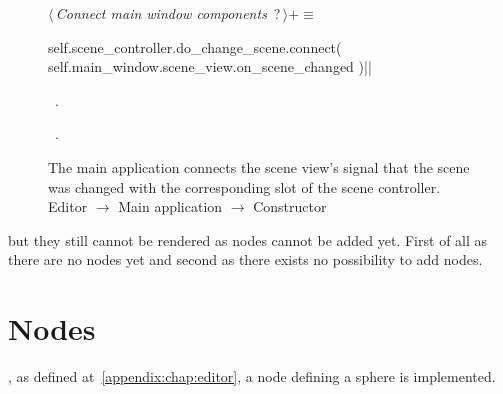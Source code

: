 \documentclass[%
    a4paper,    %
    justified,  %
    nobib,      %
    openany     %
]{tufte-book}
\makeatletter
\renewcommand{\label}[1]{\@tufte@label{##1}}%
\makeatother
\begin{document}
\begin{figure}
\begin{flushleft} \small
\begin{minipage}{\linewidth}\label{scrap98}\raggedright\small
{} $\langle\,${\itshape Connect main window components}\nobreak\ {\footnotesize {?}}$\,\rangle+\equiv$
\vspace{-1ex}
\begin{pythoncode}
self.scene_controller.do_change_scene.connect(
    self.main_window.scene_view.on_scene_changed
)|\NWsep|
\end{pythoncode}
\vspace{1.5ex}
\footnotesize
\begin{list}{}{\setlength{\itemsep}{-\parsep}\setlength{\itemindent}{-\leftmargin}}
\item \NWtxtMacroDefBy\ .
\item \NWtxtMacroRefIn\ .

\item{}
\end{list}
\end{minipage}\vspace{4ex}
\end{flushleft}
\caption{The main application connects the scene view's signal that the scene
  was changed with the corresponding slot of the scene controller.
  \newline{}\newline{}Editor $\rightarrow$ Main application $\rightarrow$
  Constructor}
\label{editor:lst:main-application:constructor:connect-change-scene}
\end{figure}

 but they still
cannot be rendered as nodes cannot be added yet. First of all as there are no
nodes yet and second as there exists no possibility to add nodes.

\chapter{Nodes}
\label{appendix:chap:nodes}

, as defined
at~\autoref{appendix:chap:editor}, a node defining a sphere is implemented.
\end{document}
